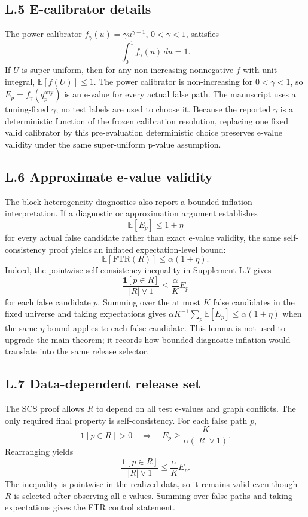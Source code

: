 \documentclass[11pt]{article}
\newcommand{\E}{\mathbb E}
\newcommand{\ind}{\mathbf 1}
\begin{document}
\subsection*{L.5 E-calibrator details}

The power calibrator \(f_\gamma(u)=\gamma u^{\gamma-1}\), \(0<\gamma<1\), satisfies
\[
\int_0^1 f_\gamma(u)\,du=1.
\]
If \(U\) is super-uniform, then for any non-increasing nonnegative \(f\) with unit integral, \(\E[f(U)]\le1\).
The power calibrator is non-increasing for \(0<\gamma<1\), so \(E_p=f_\gamma(q_p^{\mathrm{any}})\) is an e-value for every actual false path.
The manuscript uses a tuning-fixed \(\gamma\); no test labels are used to choose it.
Because the reported \(\gamma\) is a deterministic function of the frozen calibration resolution, replacing one fixed valid calibrator by this pre-evaluation deterministic choice preserves e-value validity under the same super-uniform p-value assumption.

\subsection*{L.6 Approximate e-value validity}

The block-heterogeneity diagnostics also report a bounded-inflation interpretation.
If a diagnostic or approximation argument establishes
\[
\E[E_p]\le 1+\eta
\]
for every actual false candidate rather than exact e-value validity, the same self-consistency proof yields an inflated expectation-level bound:
\[
\E[\mathrm{FTR}(R)] \le \alpha(1+\eta).
\]
Indeed, the pointwise self-consistency inequality in Supplement L.7 gives
\[
\frac{\ind[p\in R]}{|R|\vee1}\le\frac{\alpha}{K}E_p
\]
for each false candidate \(p\).
Summing over the at most \(K\) false candidates in the fixed universe and taking expectations gives \(\alpha K^{-1}\sum_p \E[E_p]\le \alpha(1+\eta)\) when the same \(\eta\) bound applies to each false candidate.
This lemma is not used to upgrade the main theorem; it records how bounded diagnostic inflation would translate into the same release selector.

\subsection*{L.7 Data-dependent release set}

The SCS proof allows \(R\) to depend on all test e-values and graph conflicts.
The only required final property is self-consistency.
For each false path \(p\),
\[
\ind[p\in R]>0
\quad\Rightarrow\quad
E_p\ge\frac{K}{\alpha(|R|\vee1)}.
\]
Rearranging yields
\[
\frac{\ind[p\in R]}{|R|\vee1}\le \frac{\alpha}{K}E_p.
\]
The inequality is pointwise in the realized data, so it remains valid even though \(R\) is selected after observing all e-values.
Summing over false paths and taking expectations gives the FTR control statement.
\end{document}
